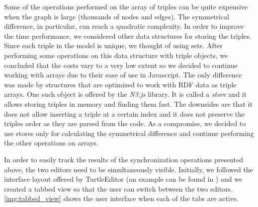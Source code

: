 Some of the operations performed on the array of triples can be quite expensive when the graph is large (thousands of nodes and edges). The symmetrical difference, in particular, can reach a quadratic complexity. In order to improve the time performance, we considered other data structures for storing the triples. Since each triple in the model is unique, we thought of using sets. After performing some operations on this data structure with triple objects, we concluded that the costs vary to a very low extent so we decided to continue working with arrays due to their ease of use in Javascript. The only difference was made by structures that are optimized to work with RDF data as triple arrays. One such object is offered by the \textit{N3.js} library. It is called a \textit{store} and it allows storing triples in memory and finding them fast. The downsides are that it does not allow inserting a triple at a certain index and it does not preserve the triples order as they are parsed from the code. As a compromise, we decided to use stores only for calculating the symmetrical difference and continue performing the other operations on arrays.

In order to easily track the results of the synchronization operations presented above, the two editors need to be simultaneously visible. Initially, we followed the interface layout offered by TurtleEditor (an example can be found in \cite{Petersen2016}) and we created a tabbed view so that the user can switch between the two editors. \autoref{img:tabbed_view} shows the user interface when each of the tabs are active.


